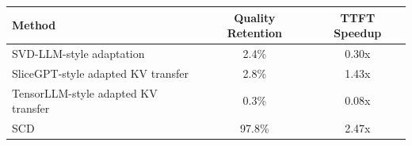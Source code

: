 \begin{tabular}{lcc}
\toprule
\textbf{Method} & \textbf{Quality Retention} & \textbf{TTFT Speedup} \\
\midrule
SVD-LLM-style adaptation & 2.4\% & 0.30x \\
SliceGPT-style adapted KV transfer & 2.8\% & 1.43x \\
TensorLLM-style adapted KV transfer & 0.3\% & 0.08x \\
SCD & 97.8\% & 2.47x \\
\bottomrule
\end{tabular}
